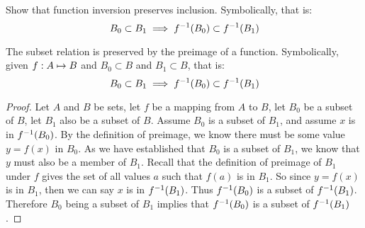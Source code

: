 \documentclass[main.tex]{subfiles}
\begin{document}
\subproblem{}\label{s2p2a}

Show that function inversion preserves inclusion. Symbolically, that is:
\[B_0 \subset B_1 \implies {f}^{-1}(B_0) \subset {f}^{-1}(B_1)\]

\begin{thm}
	The subset relation is preserved by the preimage of a function.
	Symbolically, given \({f}: {A} \mapsto{} {B}\) and \(B_0 \subset B\) and
	\(B_1 \subset B\), that is:
	\[B_0 \subset B_1 \implies {f}^{-1}(B_0) \subset {f}^{-1}(B_1)\]
\end{thm}
\begin{proof}
	Let \(A\) and \(B\) be sets, let \(f\) be a mapping from \(A\) to \(B\),
	let \(B_0\) be a subset of \(B\), let \(B_1\) also be a subset of \(B\).
	Assume \(B_0\) is a subset of \(B_1\), and assume \(x\) is in
	\({f}^{-1}(B_0)\). By the definition of preimage, we know there must
	be some value \(y = f(x)\) in \(B_0\). As we have established that
	\(B_0\) is a subset of \(B_1\), we know that \(y\) must also be a member
	of \(B_1\). Recall that the definition of preimage of \(B_1\) under
	\(f\) gives the set of all values \(a\) such that \(f(a)\) is in
	\(B_1\). So since \(y = f(x)\) is in \(B_1\), then we can say \(x\) is
	in \({f}^{-1}(B_1)\). Thus \({f}^{-1}(B_0)\) is a subset of
	\({f}^{-1}(B_1)\). Therefore \(B_0\) being a subset of \(B_1\)
	implies that \({f}^{-1}(B_0)\) is a subset of \({f}^{-1}(B_1)\).
\end{proof}
\end{document}
